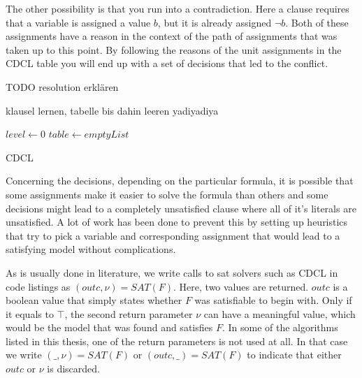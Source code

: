 The other possibility is that you run into a contradiction. Here a clause requires that a variable is assigned a value $b$, but it is already assigned $\neg b$. Both of these assignments have a reason in the context of the path of assignments that was taken up to this point. By following the reasons of the unit assignments in the CDCL table you will end up with a set of decisions that led to the conflict. 

TODO resolution erklären

klausel lernen, tabelle bis dahin leeren yadiyadiya


\begin{algorithm}
\DontPrintSemicolon
{}
$level \gets 0$\;
$table \gets emptyList$\;
\caption{{\sc CDCL}}
\end{algorithm}


Concerning the decisions, depending on the particular formula, it is possible that some assignments make it easier to solve the formula than others and some decisions might lead to a completely unsatisfied clause where all of it's literals are unsatisfied. A lot of work has been done to prevent this by setting up heuristics that try to pick a variable and corresponding assignment that would lead to a satisfying model without complications.

As is usually done in literature, we write calls to sat solvers such as CDCL in code listings as $(outc,\nu) = SAT(F)$. Here, two values are returned. $outc$ is a boolean value that simply states whether $F$ was satisfiable to begin with. Only if it equals to $\top$, the second return parameter $\nu$ can have a meaningful value, which would be the model that was found and satisfies $F$. In some of the algorithms listed in this thesis, one of the return parameters is not used at all. In that case we write $(\_,\nu) = SAT(F)$ or $(outc,\_) = SAT(F)$ to indicate that either $outc$ or $\nu$ is discarded.